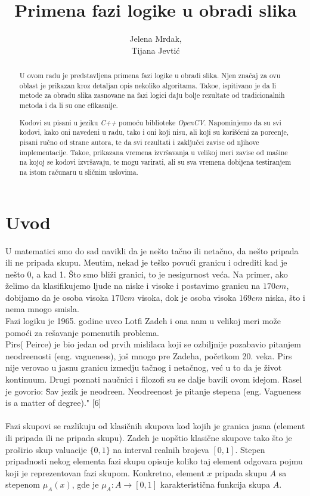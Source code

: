 \documentclass[12pt,a4paper]{article}
\title{Primena fazi logike u obradi slika}
\author{Jelena Mrdak,\\ Tijana Jevti\' c}
\theoremstyle{definition}
\theoremstyle{remark}
\theoremstyle{plain}
\begin{document}
\maketitle

\begin{abstract}
U ovom radu je predstavljena primena fazi logike u obradi slika. Njen zna\v caj za ovu oblast je prikazan kroz detaljan opis nekoliko algoritama. Tako\dj e, ispitivano je da li metode za obradu slika zasnovane na fazi logici daju bolje rezultate od tradicionalnih metoda i da li su one efikasnije.

Kodovi su pisani u jeziku \textit{C++} pomo\' cu biblioteke \textit{OpenCV}.  Napominjemo da su svi kodovi, kako oni navedeni u radu, tako i oni koji nisu, ali koji su kori\v s\' ceni za pore\dj enje, pisani ru\v cno od strane autora, te da svi rezultati i zaklju\v cci zavise od njihove implementacije. Tako\dj e, prikazana vremena izvr\v savanja u velikoj meri zavise od ma\v sine na kojoj se kodovi izvr\v savaju, te mogu varirati, ali su sva vremena dobijena testiranjem na istom ra\v cunaru u sli\v cnim uslovima.
\end{abstract}

\newpage
\tableofcontents

\newpage
\section{Uvod}
U matematici smo do sad navikli da je ne\v sto ta\v cno ili neta\v cno, da ne\v sto pripada ili ne pripada skupu. Me\dj utim, nekad je te\v sko povu\' ci granicu i odrediti kad je ne\v sto 0, a kad 1. \v Sto smo bli\v zi granici, to je nesigurnost ve\' ca. Na primer, ako \v zelimo da klasifikujemo ljude na niske i visoke i postavimo granicu na $170 cm$, dobijamo da je osoba visoka $170 cm$ visoka, dok je osoba visoka $169 cm$ niska, \v sto i nema mnogo smisla.\\

Fazi logiku je 1965. godine uveo Lotfi Zadeh i ona nam u velikoj meri mo\v ze pomo\' ci za re\v savanje pomenutih problema. \\
Pirs( Peirce) je bio jedan od prvih mislilaca koji se ozbiljnije pozabavio pitanjem neodre\dj enosti (eng. vagueness), jo\v s mnogo pre Zadeha, po\v cetkom 20. veka. 
Pirs nije verovao u jasnu granicu izmedju ta\v cnog i neta\v cnog, ve\' c u to da je \v zivot kontinuum.
Drugi poznati nau\v cnici i filozofi su se dalje bavili ovom idejom. Rasel je govorio: \"Sav jezik je neodre\dj en. Neodre\dj enost je pitanje stepena (eng. Vagueness is a matter of degree)." [6]
\\ \\
Fazi skupovi se razlikuju od klasi\v cnih skupova kod kojih je granica jasna (element ili pripada ili ne pripada skupu). Zadeh je uop\v stio klasi\v cne skupove tako \v sto je pro\v sirio skup valuacije $\{0, 1\}$ na interval realnih brojeva $[0, 1]$. Stepen pripadnosti nekog elementa fazi skupu opisuje koliko taj element odgovara pojmu koji je reprezentovan fazi skupom. Konkretno, element $x$ pripada skupu $A$ sa stepenom $\mu_{A}(x)$, gde je $\mu_{A} : A \rightarrow [0, 1]$ karakteristi\v cna funkcija skupa $A$.\\
\end{document}
